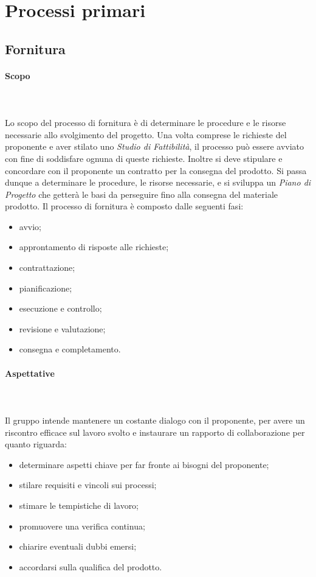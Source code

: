 \section{Processi primari}

\subsection{Fornitura}

\paragraph{Scopo}\mbox{}\\ \mbox{}\\
Lo scopo del processo di fornitura è di determinare le procedure e le risorse 
necessarie allo svolgimento del progetto. Una volta comprese le richieste del 
proponente e aver stilato uno \textit{Studio di Fattibilità}, il processo può 
essere avviato con fine di soddisfare ognuna di queste richieste. Inoltre si 
deve stipulare e concordare con il proponente un contratto per la consegna del 
prodotto. Si passa dunque a determinare le procedure, le risorse necessarie, e 
si sviluppa un \textit{Piano di Progetto} che getterà le basi da perseguire fino 
alla consegna del materiale prodotto.
Il processo di fornitura è composto dalle seguenti fasi:
	\begin{itemize}
		\item avvio;
		\item approntamento di risposte alle richieste;
		\item contrattazione;
		\item pianificazione;
		\item esecuzione e controllo;
		\item revisione e valutazione;
		\item consegna e completamento.
	\end{itemize}
	
\paragraph{Aspettative} \mbox{}\\ \mbox{}\\
Il gruppo intende mantenere un costante dialogo con il proponente, per avere un 
riscontro efficace sul lavoro svolto e instaurare un rapporto di collaborazione 
per quanto riguarda:
	\begin{itemize}
		\item determinare aspetti chiave per far fronte ai bisogni del proponente;
		\item stilare requisiti e vincoli sui processi;
		\item stimare le tempistiche di lavoro;
		\item promuovere una verifica continua;
		\item chiarire eventuali dubbi emersi;
		\item accordarsi sulla qualifica del prodotto.
	\end{itemize}
	
